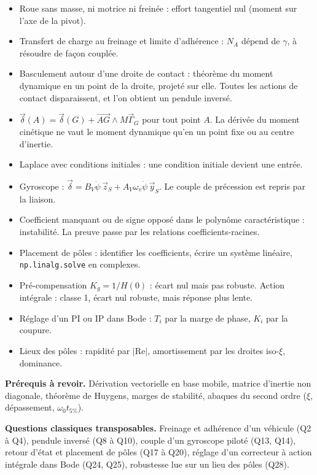 \documentclass[11pt,a4paper]{article}
\providecommand{\tightlist}{\setlength{\itemsep}{0pt}\setlength{\parskip}{0pt}}
\begin{document}
\begin{itemize}
\tightlist
\item
  Roue sans masse, ni motrice ni freinée : effort tangentiel nul (moment sur l'axe de la pivot).
\item
  Transfert de charge au freinage et limite d'adhérence : \(N_A\) dépend de \(\gamma\), à résoudre de façon couplée.
\item
  Basculement autour d'une droite de contact : théorème du moment dynamique en un point de la droite, projeté sur elle. Toutes les actions de contact disparaissent, et l'on obtient un pendule inversé.
\item
  \(\vec\delta(A)=\vec\delta(G)+\overrightarrow{AG}\wedge M\vec\Gamma_G\) pour tout point \(A\). La dérivée du moment cinétique ne vaut le moment dynamique qu'en un point fixe ou au centre d'inertie.
\item
  Laplace avec conditions initiales : une condition initiale devient une entrée.
\item
  Gyroscope : \(\vec\delta=B_V\ddot\psi\,\vec z_S+A_V\omega_v\dot\psi\,\vec y_S\). Le couple de précession est repris par la liaison.
\item
  Coefficient manquant ou de signe opposé dans le polynôme caractéristique : instabilité. La preuve passe par les relations coefficients-racines.
\item
  Placement de pôles : identifier les coefficients, écrire un système linéaire, \texttt{np.linalg.solve} en complexes.
\item
  Pré-compensation \(K_g=1/H(0)\) : écart nul mais pas robuste. Action intégrale : classe 1, écart nul robuste, mais réponse plus lente.
\item
  Réglage d'un PI ou IP dans Bode : \(T_i\) par la marge de phase, \(K_i\) par la coupure.
\item
  Lieux des pôles : rapidité par \(|\mathrm{Re}|\), amortissement par les droites iso-\(\xi\), dominance.
\end{itemize}

\textbf{Prérequis à revoir.} Dérivation vectorielle en base mobile, matrice d'inertie non diagonale, théorème de Huygens, marges de stabilité, abaques du second ordre (\(\xi\), dépassement, \(\omega_0t_{5\%}\)).

\textbf{Questions classiques transposables.} Freinage et adhérence d'un véhicule (Q2 à Q4), pendule inversé (Q8 à Q10), couple d'un gyroscope piloté (Q13, Q14), retour d'état et placement de pôles (Q17 à Q20), réglage d'un correcteur à action intégrale dans Bode (Q24, Q25), robustesse lue sur un lieu des pôles (Q28).
\end{document}
